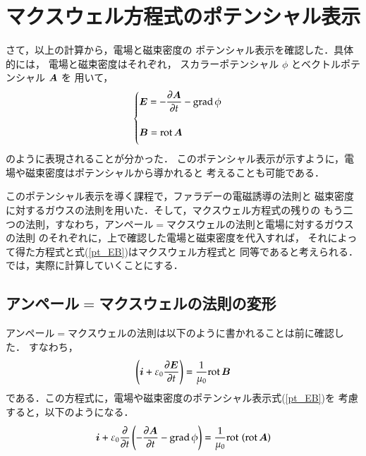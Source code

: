     \section{マクスウェル方程式のポテンシャル表示}
    \begin{mycomment}
            さて，以上の計算から，電場と磁束密度の
            ポテンシャル表示を確認した．具体的には，
            電場と磁束密度はそれぞれ，
            スカラーポテンシャル $\phi$ とベクトルポテンシャル $\boldsymbol{A}$ を
            用いて，
            \begin{align}\label{pt_EB}
            \begin{cases}
            \displaystyle\bE=-\frac{\rd\bA}{\rd t}-\dgrad\phi \\  \notag \\
            \vspace{2mm}
            \displaystyle\bB=\drot\bA
            \end{cases}
            \end{align}
            のように表現されることが分かった．
            このポテンシャル表示が示すように，電場や磁束密度はポテンシャルから導かれると
            考えることも可能である．

            このポテンシャル表示を導く課程で，ファラデーの電磁誘導の法則と
            磁束密度に対するガウスの法則を用いた．そして，マクスウェル方程式の残りの
            もう二つの法則，すなわち，アンペール$=$マクスウェルの法則と電場に対するガウスの法則
            のそれぞれに，上で確認した電場と磁束密度を代入すれば，
            それによって得た方程式と式(\ref{pt_EB})はマクスウェル方程式と
            同等であると考えられる．では，実際に計算していくことにする．
    \end{mycomment}


        \subsection{アンペール$=$マクスウェルの法則の変形}
            アンペール$=$マクスウェルの法則は以下のように書かれることは前に確認した．
            すなわち，
            \begin{align}
            \left(\boldsymbol{i}+
            \varepsilon_{0}\frac{\partial \boldsymbol{E}}{\partial t}
            \right)
            =\frac{1}{\mu_{0}}\mathrm{rot}\,\boldsymbol{B}
            \end{align}
            である．この方程式に，電場や磁束密度のポテンシャル表示式(\ref{pt_EB})を
            考慮すると，以下のようになる．
            \begin{align}\label{AM_phi_A}
            \bi+
            \varepsilon_{0}\frac{\rd }{\rd t}
            \left( -\frac{\rd\bA}{\rd t}-\dgrad\phi\right)
            =\frac{1}{\mu_{0}}\drot\left(\drot\bA\right)
            \end{align}


